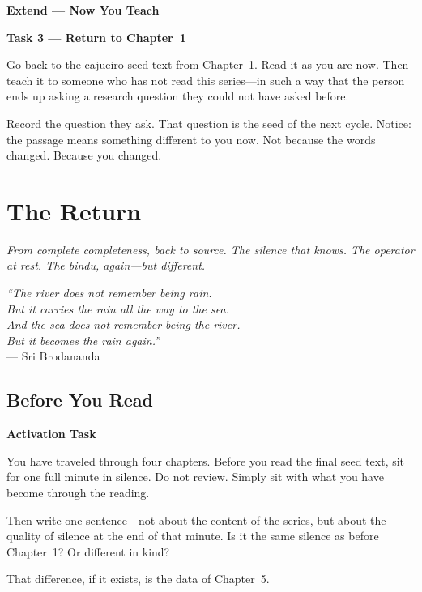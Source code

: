 \documentclass[11pt, twoside, openright]{book}
\theoremstyle{plain}
\theoremstyle{definition}
\newenvironment{extendbox}{%
  \begin{mdframed}[backgroundcolor=ExtendBox,linecolor=violet!70,linewidth=0.5pt,innertopmargin=6pt,innerbottommargin=6pt]
  \noindent\textbf{Extend --- Now You Teach}\par\medskip}{\end{mdframed}}
\newenvironment{activationbox}{%
  \begin{mdframed}[backgroundcolor=AlertBox,linecolor=orange!70,linewidth=0.5pt,innertopmargin=6pt,innerbottommargin=6pt]
  \noindent\textbf{Activation Task}\par\medskip}{\end{mdframed}}
\begin{document}
\begin{extendbox}
\textbf{Task 3 --- Return to Chapter~1}

Go back to the cajueiro seed text from Chapter~1. Read it as you are
now. Then teach it to someone who has not read this series---in such
a way that the person ends up asking a research question they could
not have asked before.

Record the question they ask. That question is the seed of the next
cycle. Notice: the passage means something different to you now. Not
because the words changed. Because you changed.
\end{extendbox}
\chapter{The Return}
\textit{From complete completeness, back to source.
The silence that knows. The operator at rest. The bindu, again---but different.}

\begin{flushright}
\textit{``The river does not remember being rain.\\
But it carries the rain all the way to the sea.\\
And the sea does not remember being the river.\\
But it becomes the rain again.''}\\
--- Sri Brodananda
\end{flushright}

\section{Before You Read}

\begin{activationbox}
You have traveled through four chapters. Before you read the final seed text,
sit for one full minute in silence. Do not review. Simply sit with what you
have become through the reading.

Then write one sentence---not about the content of the series, but about the
quality of silence at the end of that minute. Is it the same silence as before
Chapter~1? Or different in kind?

That difference, if it exists, is the data of Chapter~5.
\end{activationbox}
\end{document}
